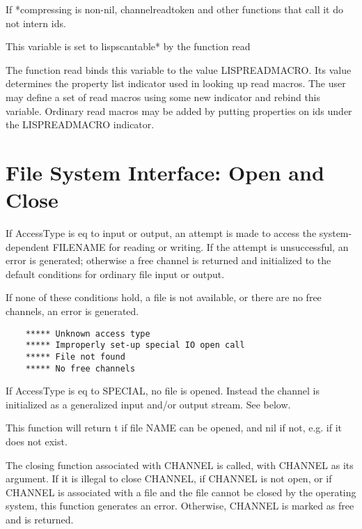 {
    If  *compressing  is  non-nil,  channelreadtoken  and  other
    functions that call it do not intern ids.
}

{ This variable is set to lispscantable* by the function read }

{
    The  function  read  binds  this  variable  to   the   value
    LISPREADMACRO.   Its  value  determines  the  property  list
    indicator used in looking up read  macros.    The  user  may
    define  a  set  of  read macros using some new indicator and
    rebind this variable.  Ordinary read macros may be added  by
    putting properties on ids under the LISPREADMACRO indicator.
}

\section{File System Interface: Open and Close}

{    If  AccessType  is eq to input or output, an attempt is made
    to access  the  system-dependent  FILENAME  for  reading  or
    writing.    If  the  attempt  is  unsuccessful,  an error is
    generated;  otherwise  a  free  channel  is   returned   and
    initialized  to  the  default  conditions  for ordinary file
    input or output.
}
    
				If none of these conditions hold, a file is  not  available,
    or there are no free channels, an error is generated.

\begin{verbatim}
    ***** Unknown access type
    ***** Improperly set-up special IO open call
    ***** File not found
    ***** No free channels
\end{verbatim}
    If  AccessType is eq to SPECIAL, no file is opened.  Instead
    the channel is initialized as  a  generalized  input  and/or
    output stream.  See below.

{    This  function will return t if file NAME can be opened, and
    nil if not, e.g. if it does not exist.
}

{    The closing function associated with CHANNEL is called, with
    CHANNEL as its argument.  If it is illegal to close CHANNEL,
    if CHANNEL is not open, or if CHANNEL is associated  with  a
    file  and the file cannot be closed by the operating system,
    this function  generates an error.   Otherwise,  CHANNEL  is
    marked as free and is returned.
}

